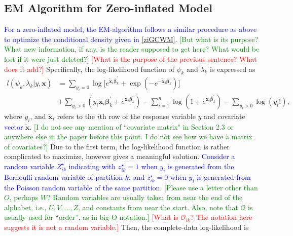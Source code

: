 \documentclass[11pt,letterpaper]{article}
\numberwithin{equation}{section}
\numberwithin{equation}{section}
\numberwithin{equation}{section}
\newcommand{\xTilda}{\tilde{\bm{x}}}
\newcommand{\zZ}{Z^\star}
\newcommand{\zz}{z^\star}
\begin{document}
\subsection{EM Algorithm for Zero-inflated Model} 
\textcolor{blue}{For a zero-inflated model, the EM-algorithm follows a similar procedure as above to optimize the conditional density given in \eqref{ziGCWM}. }  \textcolor{green}{[But what is its purpose? What new information, if any, is the reader supposed to get here? What would be lost if it were just deleted?]} \textcolor{red}{[What is the purpose of the previous sentence? What does it add?]} Specifically, the log-likelihood function of $\psi_k$ and $\lambda_k$ is expressed as
\begin{equation*}\begin{split}
l(\psi_k,\lambda_k|y,\bm{x}) &= \sum_{y_i = 0} \log \big[ e^{ \bm{ \xTilda}_i \bm{\bar{\beta}}_k^{'}  } + \exp{( - e^ { -\bm{\xTilda}_i \bm{\beta}_k^{'} })} \big]  \\ & +  \sum_{y_i > 0 } \left( y_i \xTilda_i \bm{\beta}_k^{'} + e^{ \xTilda_i \bm{\beta}_k^{'} } \right)  - \sum_{i=1}^n  \log \left(1 + e^ {\xTilda_i \bm{\bar{\beta}}_k^{'} } \right) - \sum_{y_i > 0} \log(y_i ! ),
\end{split}\end{equation*}
where $y_i$, and $\xTilda_i$ refers to the $i$th row of the response variable $y$ and covariate \textcolor{blue}{vector} $\xTilda$. \textcolor{green}{[I do not see any mention of ``covariate matrix" in Section 2.3 or anywhere else in the paper before this point. I do not see how we have a matrix of covariates?]}  Due to the first term, the log-likelihood function is rather complicated to maximize, however \cite{Lambert} gives a meaningful solution. \textcolor{blue}{ Consider a random variable $\zZ_{ik}$ indicating with ${\zz_{ik}} = 1$ when $y_i$ is generated from the Bernoulli random variable of partition $k$, and $\zz_{ik} = 0$ when $y_i$ is generated from the Poisson random variable of the same partition.} \textcolor{green}{[Please use a letter other than $O$, perhaps $W$? Random variables are usually taken from near the end of the alphabet, i.e., $U,V,\ldots,Z$, and constants from near the start. Also, note that $\mathcal{O}$ is usually used for ``order'', as in big-O notation.]} \textcolor{red}{[What is ${\mathcal{O}_{ik}}$? The notation here suggests it is not a random variable.]}  Then, the complete-data log-likelihood is 
\end{document}
